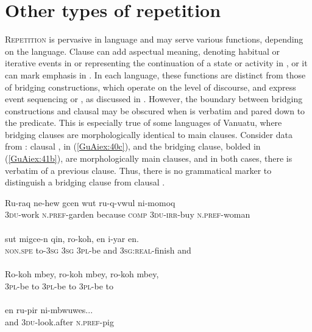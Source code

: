 \documentclass[output=paper]{LSP/langsci}
\begin{document}
\section{Other types of repetition}
\label{5otherRep}\label{sec:guerin:5}

\textsc{Repetition} is pervasive in language \citep{brown.2000} and may serve various functions, depending on the language. Clause  can add aspectual meaning, denoting habitual or iterative events in  \citep[][487]{besnier00} or representing the continuation of a state or activity in  \citep[259--260]{dimock09}, or it can mark emphasis in  \citep[][390]{schulze73}. In each language, these functions are distinct from those of bridging constructions, which operate on the level of discourse, and express event sequencing or , as discussed in . However, the boundary between bridging constructions and clausal  may be obscured when  is verbatim and pared down to the predicate. This is especially true of some  languages of Vanuatu, where bridging clauses are morphologically identical to main clauses. Consider data from : clausal , in (\ref{GuAiex:40c}), and the bridging clause, bolded in (\ref{GuAiex:41b}), are morphologically main clauses, and in both cases, there is verbatim  of a previous clause. Thus, there is no grammatical marker to distinguish a bridging clause from clausal . 


\begin{exe}
\ex \label{GuAiex:40ad}
\begin{xlist}
\ex \label{GuAiex:40a}
\gll Ru-raq   ne-hew   gcen     wut     ru-q-vwul   ni-momoq \\
\textsc{3du}-work   \textsc{n.pref}-garden because   \textsc{comp}     \textsc{3du-irr-}buy   \textsc{n.pref}-woman \\
\glt {} \\
\ex \label{GuAiex:40b}
\gll sut    migce-n   qin,   ro-koh,    en   i-yar       en. \\
\textsc{non.spe}  to-\textsc{3sg}     \textsc{3sg}   \textsc{3pl}-be    and   \textsc{3sg:real}-finish   and \\
\glt {}\\
\ex \label{GuAiex:40c}
\gll Ro-koh   mbey, ro-koh   mbey,  ro-koh   mbey, \\
\textsc{3pl}-be        to               \textsc{3pl}-be     to  \textsc{3pl}-be     to  \\
\glt {}\\
\ex \label{GuAiex:40d}
\gll en   ru-pir       ni-mbwuwes... \\
and   \textsc{3du}-look.after   \textsc{n.pref}-pig\\
\glt {}\\
\end{xlist}
\end{exe}
\end{document}
